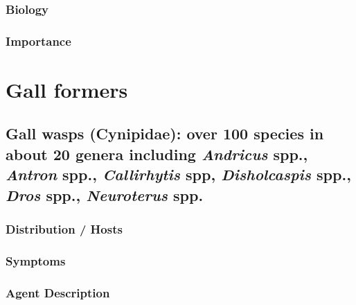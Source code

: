 \documentclass[
]{book}
\begin{document}
\subsection*{Biology}\label{biology-6}

\subsection*{Importance}\label{importance-6}

\chapter{Gall formers}\label{gall}

\section*{\texorpdfstring{Gall wasps (Cynipidae): over 100 species in about 20 genera including \emph{Andricus} spp., \emph{Antron} spp., \emph{Callirhytis} spp, \emph{Disholcaspis} spp., \emph{Dros} spp., \emph{Neuroterus} spp.}{Gall wasps (Cynipidae): over 100 species in about 20 genera including Andricus spp., Antron spp., Callirhytis spp, Disholcaspis spp., Dros spp., Neuroterus spp.}}\label{gall-wasps-cynipidae-over-100-species-in-about-20-genera-including-andricus-spp.-antron-spp.-callirhytis-spp-disholcaspis-spp.-dros-spp.-neuroterus-spp.}

\subsection*{Distribution / Hosts}\label{distribution-hosts-7}

\subsection*{Symptoms}\label{symptoms-7}

\subsection*{Agent Description}\label{agent-description-7}
\end{document}
